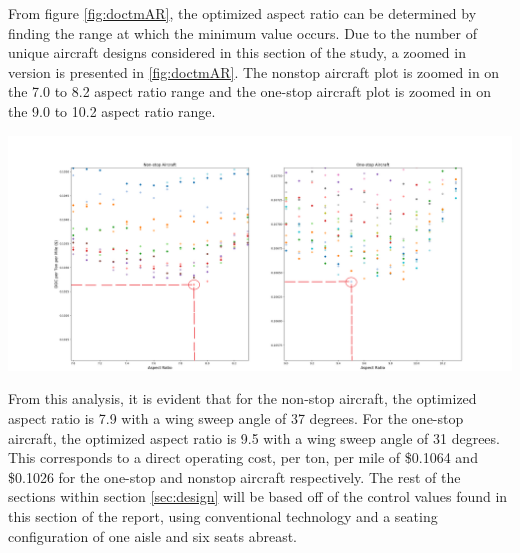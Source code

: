 \documentclass{article}
\begin{document}
        \begin{flushleft}
            From figure \ref{fig:doctmAR}, the optimized aspect ratio can be
            determined by finding the range at which the minimum value occurs.
            Due to the number of unique aircraft designs considered in this
            section of the study, a zoomed in version is presented in
            \ref{fig:doctmAR}. The nonstop aircraft plot is zoomed in on the 7.0
            to 8.2 aspect ratio range and the one-stop aircraft plot is zoomed in
            on the 9.0 to 10.2 aspect ratio range.
        \end{flushleft}

        \begin{center}
            \includegraphics[scale=0.244]{DOCTM v Sweep Angle Zoom.PNG}
            \label{fig:doctmARzoom}%
        \end{center}

        \begin{flushleft}
            From this analysis, it is evident that for the non-stop aircraft,
            the optimized aspect ratio is 7.9 with a wing sweep angle of 37
            degrees. For the one-stop aircraft, the optimized aspect ratio is
            9.5 with a wing sweep angle of 31 degrees. This corresponds to a
            direct operating cost, per ton, per mile of \$0.1064 and \$0.1026
            for the one-stop and nonstop aircraft respectively. The rest of the
            sections within section \ref{sec:design} will be based off of the
            control values found in this section of the report, using
            conventional technology and a seating configuration of one aisle and
            six seats abreast.
        \end{flushleft}
\end{document}
